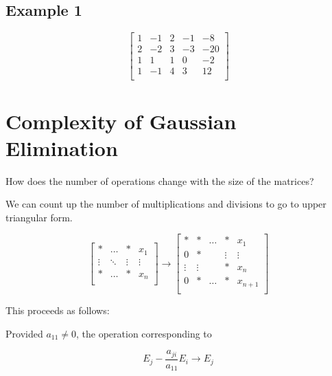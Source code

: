 \documentclass[12pt]{article}
\begin{document}
\subsection{Example 1}

\begin{equation*}
  \begin{bmatrix}
  1 & -1 & 2 & -1 & -8\\
  2 & -2 & 3 & -3 & -20\\
  1 & 1 & 1 & 0 & -2\\
  1 & -1 & 4 & 3 & 12\\
  \end{bmatrix}
\end{equation*}

\section{Complexity of Gaussian Elimination}

How does the number of operations change with the size of the matrices?

We can count up the number of multiplications and divisions to go to upper
triangular form.

\begin{equation*}
  \begin{bmatrix}
  * & \dots & * & x_1\\
  \vdots & \ddots & \vdots & \vdots\\
  * & \dots & * & x_n\\
  \end{bmatrix} 
  \to
  \begin{bmatrix}
   * & * & \dots & * & x_1\\
   0 & * &  & \vdots &  \vdots \\
   \vdots & \vdots & & * & x_n \\
   0 & * & \dots & * & x_{n+1} \\
  \end{bmatrix}
\end{equation*}

This proceeds as follows:

Provided $a_{11} \ne 0$, the operation corresponding to 

\begin{equation*}
  E_j - \frac{a_{ji}}{a_{11}} E_i \to E_j
\end{equation*}
\end{document}
